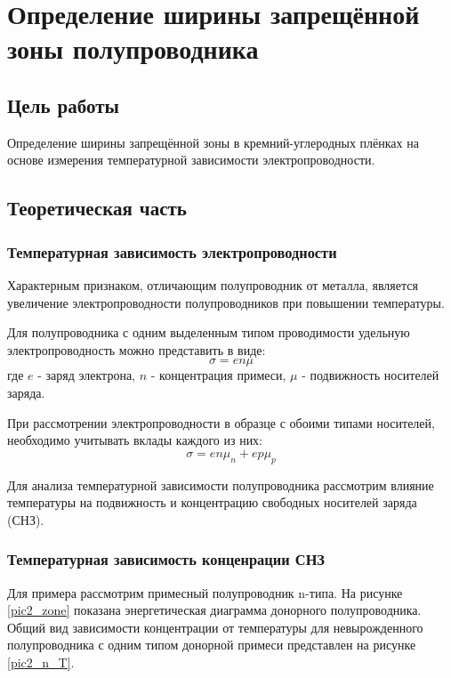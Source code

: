 \chapter{Определение ширины запрещённой зоны полупроводника}

\section{Цель работы}
Определение ширины запрещённой зоны в кремний-углеродных плёнках на основе измерения температурной зависимости электропроводности.

\section{Теоретическая часть}
\subsection{Температурная зависимость электропроводности}

Характерным признаком, отличающим полупроводник от металла, является увеличение электропроводности полупроводников при повышении температуры.

Для полупроводника с одним выделенным типом проводимости удельную электропроводность можно представить в виде:
\begin{equation}
\sigma = e n \mu
\end{equation}
где $e$ - заряд электрона, $n$ - концентрация примеси, $\mu$ - подвижность носителей заряда.

При рассмотрении электропроводности в образце с обоими типами носителей, необходимо учитывать вклады каждого из них:
\begin{equation}
\sigma = e n \mu_{n} + e p \mu_{p}
\end{equation}

Для анализа температурной зависимости полупроводника рассмотрим влияние температуры на подвижность и концентрацию свободных носителей заряда (СНЗ).

\subsection{Температурная зависимость конценрации СНЗ}

Для примера рассмотрим примесный полупроводник n-типа. На рисунке \ref{pic2_zone} показана энергетическая диаграмма донорного полупроводника. Общий вид зависимости концентрации от температуры для невырожденного полупроводника с одним типом донорной примеси представлен на рисунке \ref{pic2_n_T}.


